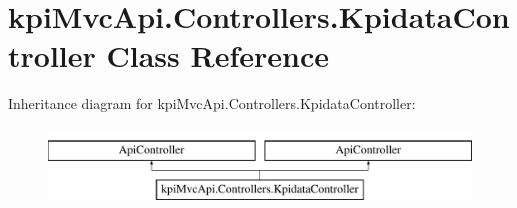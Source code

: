 \hypertarget{classkpi_mvc_api_1_1_controllers_1_1_kpidata_controller}{}\section{kpi\+Mvc\+Api.\+Controllers.\+Kpidata\+Controller Class Reference}
\label{classkpi_mvc_api_1_1_controllers_1_1_kpidata_controller}
Inheritance diagram for kpi\+Mvc\+Api.\+Controllers.\+Kpidata\+Controller\+:\begin{figure}[H]
\begin{center}
\leavevmode
\includegraphics[height=2.000000cm]{classkpi_mvc_api_1_1_controllers_1_1_kpidata_controller}
\end{center}
\end{figure}
